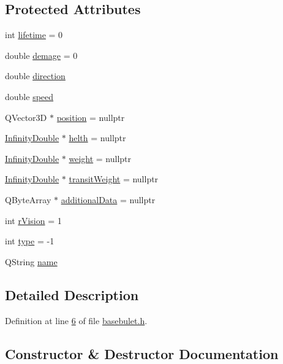 \subsection*{Protected Attributes}
\begin{DoxyCompactItemize}
\item 
int \hyperlink{a00153_a9ad5db3e6e5d664e1ca4390285d43782}{lifetime} = 0
\item 
double \hyperlink{a00153_af945a06780b38cebab807ff1ad63eb7a}{demage} = 0
\item 
double \hyperlink{a00153_a16b71d8fb0386d4b048ca96c8c806896}{direction}
\item 
double \hyperlink{a00153_ad90bbbab47b5e3b8fa1a683210d026d7}{speed}
\item 
Q\+Vector3D $\ast$ \hyperlink{a00137_afe080b1942ec40832e94cb884ec87456}{position} = nullptr
\item 
\hyperlink{a00161}{Infinity\+Double} $\ast$ \hyperlink{a00137_a440cf9e7d61c33482ab256a6e944b34d}{helth} = nullptr
\item 
\hyperlink{a00161}{Infinity\+Double} $\ast$ \hyperlink{a00137_a99901016531fd27b9b197dc88d3bfa4a}{weight} = nullptr
\item 
\hyperlink{a00161}{Infinity\+Double} $\ast$ \hyperlink{a00137_a865c937433f7d46665ca17e5adccd9df}{transit\+Weight} = nullptr
\item 
Q\+Byte\+Array $\ast$ \hyperlink{a00137_a4d3547697d3bd0c2d65c83b07b3f8f91}{additional\+Data} = nullptr
\item 
int \hyperlink{a00137_ae0ad3c240950eba352aeb04e6a9296b4}{r\+Vision} = 1
\item 
int \hyperlink{a00137_a73a4ca23072b617f3d17004e3c671bca}{type} = -\/1
\item 
Q\+String \hyperlink{a00137_af35fba4ed599605c3d78b3c3a71fa467}{name}
\end{DoxyCompactItemize}


\subsection{Detailed Description}


Definition at line \hyperlink{a00035_source_l00006}{6} of file \hyperlink{a00035_source}{basebulet.\+h}.



\subsection{Constructor \& Destructor Documentation}
\mbox{\label{a00153_abdfda473d6ddd2a2fb35783dfa5ef836}} 
